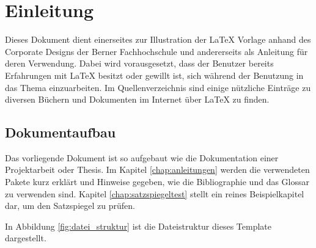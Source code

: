 \chapter{Einleitung}
\label{chap:einleitung}

Dieses Dokument dient einerseites zur Illustration der \LaTeX{} Vorlage anhand des Corporate Designs der Berner Fachhochschule und andererseits als Anleitung für deren Verwendung. Dabei wird vorausgesetzt, dass der Benutzer bereits Erfahrungen mit \LaTeX{} besitzt oder gewillt ist, sich während der Benutzung in das Thema einzuarbeiten. Im Quellenverzeichnis sind einige nützliche Einträge zu diversen Büchern und Dokumenten im Internet über \LaTeX{} zu finden.

\nocite{kopka:band1}
\nocite{raichle:bibtex_programmierung}
\nocite{MiKTeX}
\nocite{KOMA}
\nocite{TeXnicCenter}
\nocite{Marti06}
\nocite{Erbsland08}
\nocite{juergens:einfuehrung}
\nocite{juergens:fortgeschritten}

\section{Dokumentaufbau}
\label{sec:einleitung_aufbau}

Das vorliegende Dokument ist so aufgebaut wie die Dokumentation einer Projektarbeit oder Thesis. Im Kapitel \ref{chap:anleitungen} werden die verwendeten Pakete kurz erklärt und Hinweise gegeben, wie die Bibliographie und das Glossar zu verwenden sind. Kapitel \ref{chap:satzspiegeltest} stellt ein reines Beispielkapitel dar, um den Satzspiegel zu prüfen.

In Abbildung \ref{fig:datei_struktur} ist die Dateistruktur dieses Template dargestellt.

